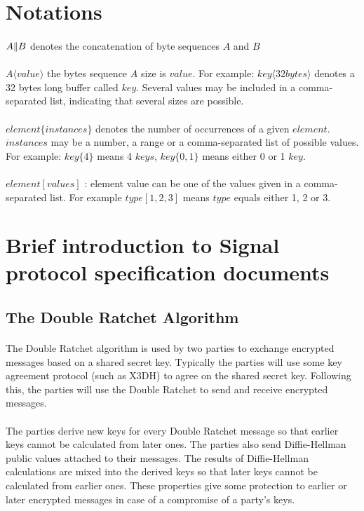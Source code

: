 \documentclass[a4paper,11pt]{article}
\begin{document}
\section{Notations}
\paragraph{}$A\Arrowvert B$ denotes the concatenation of byte sequences $A$ and $B$
\paragraph{}$A\langle value\rangle$ the bytes sequence $A$ size is $value$. For example: $key\langle 32bytes\rangle $ denotes a 32 bytes long buffer called $key$. Several values may be included in a comma-separated list, indicating that several sizes are possible.
\paragraph{}$element\{ instances\}$ denotes the number of occurrences of a given $element$. $instances$ may be a number, a range or a comma-separated list of possible values. For example: $key\{ 4\}$ means 4 $keys$, $key\{ 0,1\}$ means either 0 or 1 $key$.
\paragraph{}$element[values]$ : element value can be one of the values given in a comma-separated list. For example $type[1,2,3]$ means $type$ equals either 1, 2 or 3.

\section{Brief introduction to Signal protocol specification documents}
  \subsection{The Double Ratchet Algorithm\cite{doubleRatchet}}
    \paragraph{}The Double Ratchet algorithm is used by two parties to exchange encrypted
messages based on a shared secret key. Typically the parties will use some
key agreement protocol (such as X3DH\cite{x3dh}) to agree on the shared secret key.
Following this, the parties will use the Double Ratchet to send and receive
encrypted messages.
    \paragraph{}The parties derive new keys for every Double Ratchet message so that earlier keys
cannot be calculated from later ones. The parties also send Diffie-Hellman public
values attached to their messages. The results of Diffie-Hellman calculations
are mixed into the derived keys so that later keys cannot be calculated from
earlier ones. These properties give some protection to earlier or later encrypted
messages in case of a compromise of a party’s keys.
  
\end{document}
